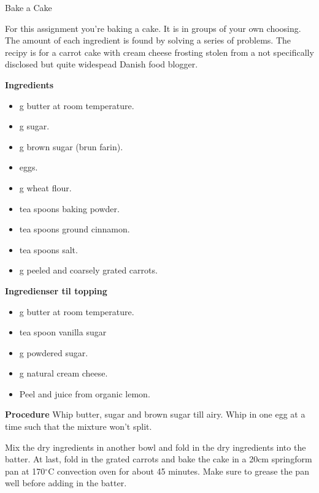 \begin{center}
	\LARGE
	Bake a Cake
\end{center}

For this assignment you're baking a cake. It is in groups of your own choosing. The amount of each ingredient is found by solving a series of problems. The recipy is for a carrot cake with cream cheese frosting stolen from a not specifically disclosed but quite widespead Danish food blogger.

\textbf{Ingredients}
\begin{itemize}
	\item[$\cdot$] \underline{\phantom{150}} g butter at room temperature.
	\item[$\cdot$] \underline{\phantom{100}} g sugar.
	\item[$\cdot$] \underline{\phantom{100}} g brown sugar (brun farin).
	\item[$\cdot$] \underline{\phantom{4}} eggs.
	\item[$\cdot$] \underline{\phantom{200}} g wheat flour.
	\item[$\cdot$] \underline{\phantom{2}} tea spoons baking powder.
	\item[$\cdot$] \underline{\phantom{1}} tea spoons ground cinnamon.
	\item[$\cdot$] \underline{\phantom{0.5}} tea spoons salt.
	\item[$\cdot$] \underline{\phantom{275}} g peeled and coarsely grated carrots.
\end{itemize}

\textbf{Ingredienser til topping}
\begin{itemize}
	\item[$\cdot$] \underline{\phantom{125}} g butter at room temperature.
	\item[$\cdot$] \underline{\phantom{1}} tea spoon vanilla sugar 
	\item[$\cdot$] \underline{\phantom{125}} g powdered sugar.
	\item[$\cdot$] \underline{\phantom{125}} g natural cream cheese.
	\item[$\cdot$] Peel and juice from \underline{\phantom{1}} organic lemon.
\end{itemize}

\textbf{Procedure}
Whip butter, sugar and brown sugar till airy. Whip in one egg at a time such that the mixture won't split.

Mix the dry ingredients in another bowl and fold in the dry ingredients into the batter. At last, fold in the grated carrots and bake the cake in a 20cm springform pan at 170$^\circ$C convection oven for about 45 minutes. Make sure to grease the pan well before adding in the batter.

